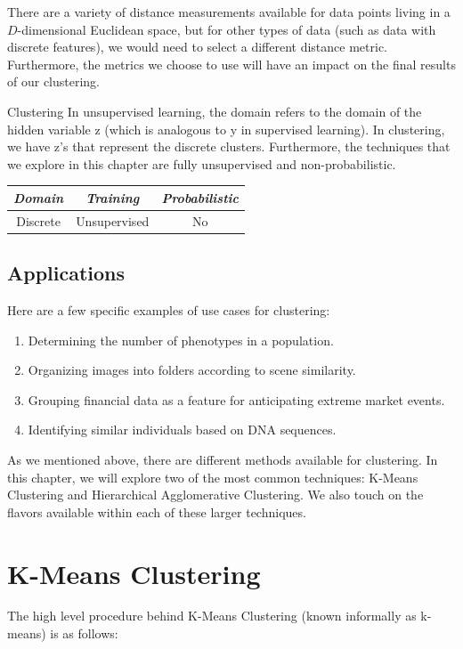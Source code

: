 There are a variety of distance measurements available for data points living in a $D$-dimensional Euclidean space, but for other types of data (such as data with discrete features), we would need to select a different distance metric. Furthermore, the metrics we choose to use will have an impact on the final results of our clustering.

\begin{mlcube}{Clustering}
In unsupervised learning, the domain refers to the domain of the hidden variable z (which is analogous to y in supervised learning). In clustering, we have z's that represent the discrete clusters. Furthermore, the techniques that we explore in this chapter are fully unsupervised and non-probabilistic.
\begin{center}
    \begin{tabular}{c|c|c}
    \textit{\textbf{Domain}} & \textit{\textbf{Training}} & \textit{\textbf{Probabilistic}} \\
    \hline
    Discrete & Unsupervised & No \\
    \end{tabular}
\end{center}
\end{mlcube}

\subsection{Applications}
Here are a few specific examples of use cases for clustering:

\begin{enumerate}
    \item Determining the number of phenotypes in a population.
    \item Organizing images into folders according to scene similarity.
    \item Grouping financial data as a feature for anticipating extreme market events.
    \item Identifying similar individuals based on DNA sequences.
\end{enumerate}

As we mentioned above, there are different methods available for clustering. In this chapter, we will explore two of the most common techniques: K-Means Clustering and Hierarchical Agglomerative Clustering. We also touch on the flavors available within each of these larger techniques.

\section{K-Means Clustering}
The high level procedure behind K-Means Clustering (known informally as k-means) is as follows:

